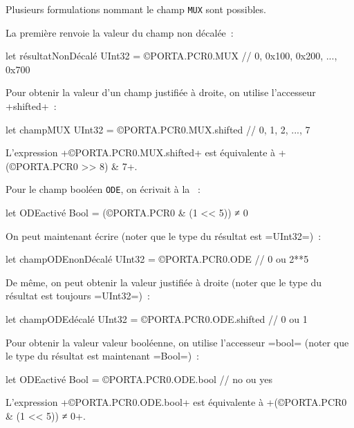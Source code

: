 Plusieurs formulations nommant le champ \texttt{MUX} sont possibles.

La première renvoie la valeur du champ non décalée~:

\begin{OMNIBUS}
let résultatNonDécalé UInt32 = ©PORTA.PCR0.MUX
  // 0, 0x100, 0x200, ..., 0x700
\end{OMNIBUS}

Pour obtenir la valeur d'un champ justifiée à droite, on utilise l'accesseur \omnibus+shifted+~:
\begin{OMNIBUS}
let champMUX UInt32 = ©PORTA.PCR0.MUX.shifted // 0, 1, 2, ..., 7
\end{OMNIBUS}

L'expression \omnibus+©PORTA.PCR0.MUX.shifted+ est équivalente à \omnibus+(©PORTA.PCR0 >> 8) & 7+.


Pour le champ booléen \texttt{ODE}, on écrivait à la ~:

\begin{OMNIBUS}
let ODEactivé Bool = (©PORTA.PCR0 & (1 << 5)) ≠ 0
\end{OMNIBUS}

On peut maintenant écrire (noter que le type du résultat est \omnibus=UInt32=)~:
\begin{OMNIBUS}
let champODEnonDécalé UInt32 = ©PORTA.PCR0.ODE // 0 ou 2**5
\end{OMNIBUS}

De même, on peut obtenir la valeur justifiée à droite (noter que le type du résultat est toujours \omnibus=UInt32=)~:
\begin{OMNIBUS}
let champODEdécalé UInt32 = ©PORTA.PCR0.ODE.shifted // 0 ou 1
\end{OMNIBUS}

Pour obtenir la valeur valeur booléenne, on utilise l'accesseur \omnibus=bool= (noter que le type du résultat est maintenant \omnibus=Bool=)~:
\begin{OMNIBUS}
let ODEactivé Bool = ©PORTA.PCR0.ODE.bool // no ou yes
\end{OMNIBUS}

L'expression \omnibus+©PORTA.PCR0.ODE.bool+ est équivalente à \omnibus+(©PORTA.PCR0 & (1 << 5)) ≠ 0+.



















